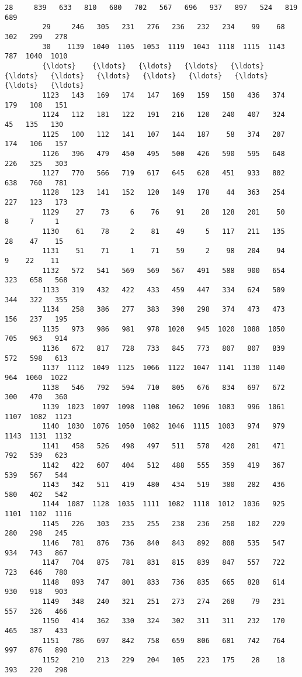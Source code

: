 \documentclass[11pt]{article}
\begin{document}
\begin{Verbatim}[commandchars=\\\{\}]
         28     839   633   810   680   702   567   696   937   897   524   819   689   
         29     246   305   231   276   236   232   234    99    68   302   299   278   
         30    1139  1040  1105  1053  1119  1043  1118  1115  1143   787  1040  1010   
         {\ldots}    {\ldots}   {\ldots}   {\ldots}   {\ldots}   {\ldots}   {\ldots}   {\ldots}   {\ldots}   {\ldots}   {\ldots}   {\ldots}   {\ldots}   
         1123   143   169   174   147   169   159   158   436   374   179   108   151   
         1124   112   181   122   191   216   120   240   407   324    45   135   130   
         1125   100   112   141   107   144   187    58   374   207   174   106   157   
         1126   396   479   450   495   500   426   590   595   648   226   325   303   
         1127   770   566   719   617   645   628   451   933   802   638   760   781   
         1128   123   141   152   120   149   178    44   363   254   227   123   173   
         1129    27    73     6    76    91    28   128   201    50     8     7     1   
         1130    61    78     2    81    49     5   117   211   135    28    47    15   
         1131    51    71     1    71    59     2    98   204    94     9    22    11   
         1132   572   541   569   569   567   491   588   900   654   323   658   568   
         1133   319   432   422   433   459   447   334   624   509   344   322   355   
         1134   258   386   277   383   390   298   374   473   473   156   237   195   
         1135   973   986   981   978  1020   945  1020  1088  1050   705   963   914   
         1136   672   817   728   733   845   773   807   807   839   572   598   613   
         1137  1112  1049  1125  1066  1122  1047  1141  1130  1140   964  1060  1022   
         1138   546   792   594   710   805   676   834   697   672   300   470   360   
         1139  1023  1097  1098  1108  1062  1096  1083   996  1061  1107  1082  1123   
         1140  1030  1076  1050  1082  1046  1115  1003   974   979  1143  1131  1132   
         1141   458   526   498   497   511   578   420   281   471   792   539   623   
         1142   422   607   404   512   488   555   359   419   367   539   567   544   
         1143   342   511   419   480   434   519   380   282   436   580   402   542   
         1144  1087  1128  1035  1111  1082  1118  1012  1036   925  1101  1102  1116   
         1145   226   303   235   255   238   236   250   102   229   280   298   245   
         1146   781   876   736   840   843   892   808   535   547   934   743   867   
         1147   704   875   781   831   815   839   847   557   722   723   646   780   
         1148   893   747   801   833   736   835   665   828   614   930   918   903   
         1149   348   240   321   251   273   274   268    79   231   557   326   466   
         1150   414   362   330   324   302   311   311   232   170   465   387   433   
         1151   786   697   842   758   659   806   681   742   764   997   876   890   
         1152   210   213   229   204   105   223   175    28    18   393   220   298   
         

\end{Verbatim}
\end{document}
